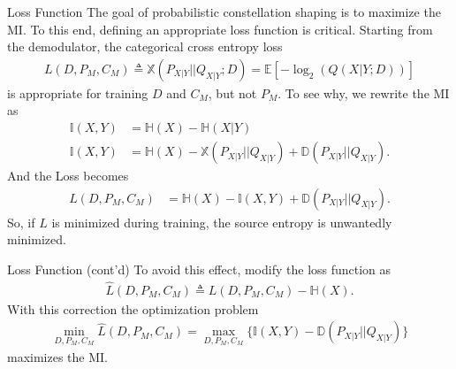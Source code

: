 \documentclass[english,aspectratio=1610,9pt,helvet,nicetitles]{ICEbeamerTUMCD}
\begin{document}
\begin{frame}{Loss Function}
	The goal of probabilistic constellation shaping is to maximize the MI. To this end, defining an appropriate loss function is critical. Starting from the demodulator, the categorical cross entropy loss
\begin{align*}
	L(D, P_M, C_M) \triangleq \mathbb{X}(P_{X|Y}||Q_{X|Y}; D) = \mathbb{E}\left[-\log_2(Q(X|Y;D))\right] 
\end{align*}
is appropriate for training $D$ and $C_M$, but not $P_M$. To see why, we rewrite the MI as
\begin{align*}
	\mathbb{I} \left(X , Y\right) &= \mathbb{H}(X) - \mathbb{H}(X|Y)\\
	\mathbb{I} \left(X , Y\right) &= \mathbb{H}(X) - \mathbb{X}(P_{X|Y}||Q_{X|Y}) + \mathbb{D}(P_{X|Y}||Q_{X|Y}).
\end{align*}
And the Loss becomes
\begin{align*}
L(D, P_M, C_M) &= \mathbb{H}(X) -\mathbb{I} \left(X , Y\right) + \mathbb{D}(P_{X|Y}||Q_{X|Y}).
\end{align*}
So, if $L$ is minimized during training, the source entropy is unwantedly minimized.
\end{frame}

\begin{frame}{Loss Function (cont'd)}
To avoid this effect, \citeauthor{Stark} modify the loss function as
\begin{align*}
	\hat{L}(D, P_M, C_M) \triangleq L(D, P_M, C_M) - \mathbb{H}(X).
\end{align*}
With this correction the optimization problem 
\begin{align*}
	\min_{D, P_M, C_M}\hat{L}(D, P_M, C_M) = \max_{D, P_M, C_M} \{ \mathbb{I} \left(X , Y\right) - \mathbb{D}(P_{X|Y}||Q_{X|Y})\}
\end{align*}
maximizes the MI.
\end{frame}
\end{document}
